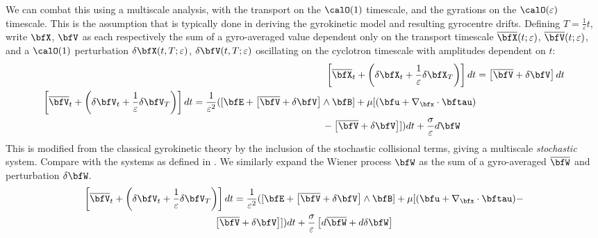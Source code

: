     We can combat this using a multiscale analysis, with the transport on the $\calO(1)$ timescale, and the gyrations on the $\calO(\varepsilon)$ timescale. This is the assumption that is typically done in deriving the gyrokinetic model and resulting gyrocentre drifts. Defining $T = \frac{1}{\varepsilon}t$, write $\bfX$, $\bfV$ as each respectively the sum of a gyro-averaged value dependent only on the transport timescale $\overline{\bfX}(t; \varepsilon)$, $\overline{\bfV}(t; \varepsilon)$, and a $\calO(1)$ perturbation $\delta\bfX(t, T; \varepsilon)$, $\delta\bfV(t, T; \varepsilon)$ oscillating on the cyclotron timescale with amplitudes dependent on $t$:
    \begin{align}
          \label{eqn:multiscale position SDE}  \left[\overline{\bfX}_{t} + \left(\delta\bfX_{t} + \frac{1}{\varepsilon}\delta\bfX_{T}\right)\right]dt  &= 
 \left[\overline{\bfV} + \delta\bfV\right]dt  \\
        \begin{split}
            \left[\overline{\bfV}_{t} + \left(\delta\bfV_{t} + \frac{1}{\varepsilon}\delta\bfV_{T}\right)\right]dt  &=  \frac{1}{\varepsilon^{2}}([\bfE + \left[\overline{\bfV} + \delta\bfV\right]\wedge\bfB] + \mu[(\bfu + \nabla_{\bfx}\cdot\bftau)  \\
            &  \;\;\;\;\;\;\;\;\;\;\;\;\;\;\;\;\;\;\;\;\;\;\;\;\;\;\;\;\;\;\;\;\;\;\;\;\;\;\;\;\;\;\;\;\;\;\;\;  - \left[\overline{\bfV} + \delta\bfV\right]])dt + \frac{\sigma}{\varepsilon}d\bfW
        \end{split}
    \end{align}
    \BA{[Ref]} This is modified from the classical gyrokinetic theory by the inclusion of the stochastic collisional terms, giving a multiscale \emph{stochastic} system. Compare with the systems as defined in . We similarly expand the Wiener process $\bfW$ as the sum of a gyro-averaged $\overline{\bfW}$ and perturbation $\delta\bfW$. 
    \begin{multline}\label{eqn:multiscale velocity SDE}
        \left[\overline{\bfV}_{t} + \left(\delta\bfV_{t} + \frac{1}{\varepsilon}\delta\bfV_{T}\right)\right]dt  =  \frac{1}{\varepsilon^{2}}([\bfE + \left[\overline{\bfV} + \delta\bfV\right]\wedge\bfB] + \mu[(\bfu + \nabla_{\bfx}\cdot\bftau) -  \\
        \left[\overline{\bfV} + \delta\bfV\right]])dt + \frac{\sigma}{\varepsilon}\left[d\overline{\bfW} + d\delta\bfW\right]
    \end{multline}
